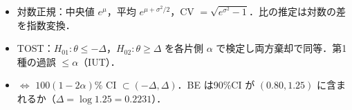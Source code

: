 \begin{summarybox}
\begin{itemize}
\item 対数正規：中央値 $e^\mu$，平均 $e^{\mu+\sigma^2/2}$，CV $=\sqrt{e^{\sigma^2}-1}$．比の推定は対数の差を指数変換．
\item TOST：$H_{01}:\theta\le-\Delta$，$H_{02}:\theta\ge\Delta$ を各片側 $\alpha$ で検定し両方棄却で同等．第1種の過誤 $\le\alpha$（IUT）．
\item $\iff$ $100(1-2\alpha)\%$ CI $\subset(-\Delta,\Delta)$．BE は90\%CI が $(0.80,1.25)$ に含まれるか（$\Delta=\log1.25=0.2231$）．
\end{itemize}
\end{summarybox}
